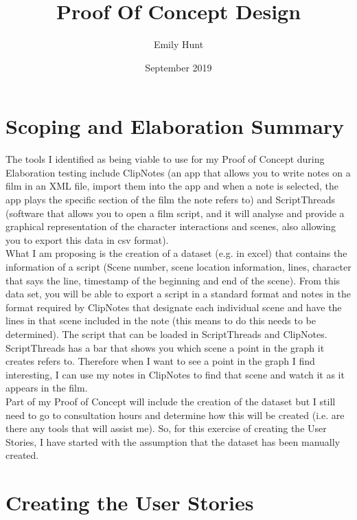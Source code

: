 \documentclass{article}
\title{\textbf{Proof Of Concept Design}}
\author{Emily Hunt}
\date{September 2019}
\begin{document}
\maketitle

\section{Scoping and Elaboration Summary}
The tools I identified as being viable to use for my Proof of Concept during Elaboration testing include ClipNotes (an app that allows you to write notes on a film in an XML file, import them into the app and when a note is selected, the app plays the specific section of the film the note refers to) and ScriptThreads (software that allows you to open a film script, and it will analyse and provide a graphical representation of the character interactions and scenes, also allowing you to export this data in csv format).\\
What I am proposing is the creation of a dataset (e.g. in excel) that contains the information of a script (Scene number, scene location information, lines, character that says the line, timestamp of the beginning and end of the scene). From this data set, you will be able to export a script in a standard format and notes in the format required by ClipNotes that designate each individual scene and have the lines in that scene included in the note (this means to do this needs to be determined). The script that can be loaded in ScriptThreads and ClipNotes. ScriptThreads has a bar that shows you which scene a point in the graph it creates refers to. Therefore when I want to see a point in the graph I find interesting, I can use my notes in ClipNotes to find that scene and watch it as it appears in the film.\\
Part of my Proof of Concept will include the creation of the dataset but I still need to go to consultation hours and determine how this will be created (i.e. are there any tools that will assist me). So, for this exercise of creating the User Stories, I have started with the assumption that the dataset has been manually created.


\section{Creating the User Stories}
\end{document}

